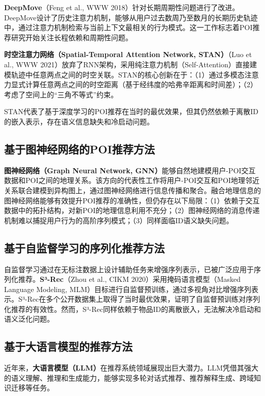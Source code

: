 \textbf{DeepMove}\cite{feng2018predicting}（Feng et al., WWW 2018）针对长期周期性问题进行了改进。DeepMove设计了历史注意力机制，能够从用户过去数周乃至数月的长期历史轨迹中，通过注意力机制检索与当前上下文最相关的行为模式。这一工作标志着POI推荐研究开始关注长程依赖和周期性问题。

\textbf{时空注意力网络（Spatial-Temporal Attention Network, STAN）}\cite{luo2021stan}（Luo et al., WWW 2021）放弃了RNN架构，采用纯注意力机制（Self-Attention）直接建模轨迹中任意两点之间的时空关联。STAN的核心创新在于：（1）通过多模态注意力显式计算任意两点之间的时空距离（基于经纬度的哈弗辛距离和时间差）；（2）考虑了空间上的``三角不等式''约束。

STAN代表了基于深度学习的POI推荐在当时的最优效果，但其仍然依赖于离散ID的嵌入表示，存在语义信息缺失和冷启动问题。

\subsection{基于图神经网络的POI推荐方法}
\label{sec:gnn_poi}

\textbf{图神经网络（Graph Neural Network, GNN）}能够自然地建模用户-POI交互数据和POI之间的地理关系。该方向的代表性工作将用户-POI交互和POI地理邻近关系联合建模到异构图上，通过图神经网络进行信息传播和聚合。融合地理信息的图神经网络能够有效提升POI推荐的准确性，但仍存在以下局限：（1）依赖于交互数据中的拓扑结构，对新POI的地理信息利用不充分；（2）图神经网络的消息传递机制难以捕捉用户行为的高阶序列模式；（3）同样面临ID语义缺失问题。

\subsection{基于自监督学习的序列化推荐方法}
\label{sec:ssl_rec}

自监督学习通过在无标注数据上设计辅助任务来增强序列表示，已被广泛应用于序列化推荐。\textbf{S³-Rec}\cite{zhou2020s3rec}（Zhou et al., CIKM 2020）采用掩码语言模型（Masked Language Modeling, MLM）目标进行自监督预训练，通过多视角对比增强序列表示。S³-Rec在多个公开数据集上取得了当时最优效果，证明了自监督预训练对序列化推荐的有效性。然而，S³-Rec同样依赖于物品ID的离散嵌入，无法解决冷启动和语义泛化问题。

\subsection{基于大语言模型的推荐方法}
\label{sec:llm_rec}

近年来，\textbf{大语言模型（LLM）}在推荐系统领域展现出巨大潜力。LLM凭借其强大的语义理解、推理和生成能力，能够实现多轮对话式推荐、推荐解释生成、跨域知识迁移等任务。

